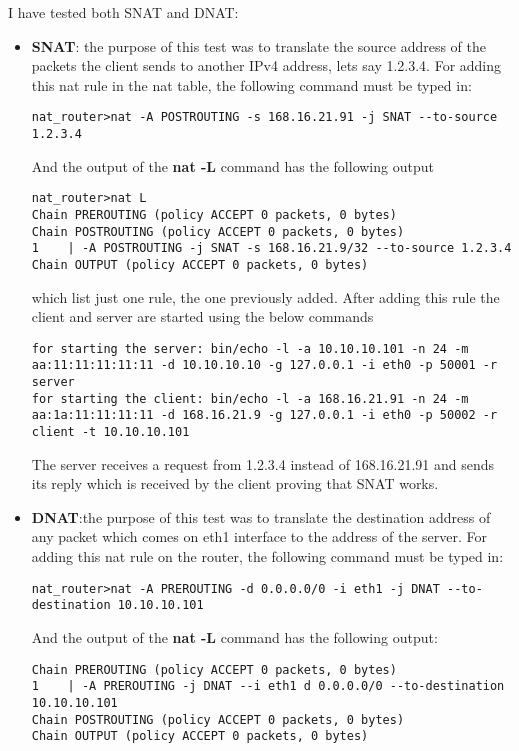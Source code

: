 {{I have tested both SNAT and DNAT:
\begin{itemize}
\item \textbf{SNAT}: the purpose of this test was to translate the source address of the packets the client sends to another IPv4 address, lets say 1.2.3.4.
For adding this nat rule in the nat table, the following command must be typed in:
\lstset{language=TeX, caption=Add SNAT rule}
\begin{lstlisting}
nat_router>nat -A POSTROUTING -s 168.16.21.91 -j SNAT --to-source 1.2.3.4
\end{lstlisting}
And the output of the \textbf{nat -L} command has the following output
\lstset{language=TeX, caption=List all rules for standard NAT chains}
\begin{lstlisting}
nat_router>nat L
Chain PREROUTING (policy ACCEPT 0 packets, 0 bytes)
Chain POSTROUTING (policy ACCEPT 0 packets, 0 bytes)
1	 | -A POSTROUTING -j SNAT -s 168.16.21.9/32 --to-source 1.2.3.4
Chain OUTPUT (policy ACCEPT 0 packets, 0 bytes)
\end{lstlisting}

which list just one rule, the one previously added. 
After adding this rule the client and server are started using the below commands
\lstset{language=TeX, caption=SNAT-starting client and server applications}
\begin{lstlisting}
for starting the server: bin/echo -l -a 10.10.10.101 -n 24 -m aa:11:11:11:11:11 -d 10.10.10.10 -g 127.0.0.1 -i eth0 -p 50001 -r server 
for starting the client: bin/echo -l -a 168.16.21.91 -n 24 -m aa:1a:11:11:11:11 -d 168.16.21.9 -g 127.0.0.1 -i eth0 -p 50002 -r client -t 10.10.10.101
\end{lstlisting}
 The server receives a request from 1.2.3.4 instead of 168.16.21.91 and sends its reply which is received by the client proving that SNAT works.
\item \label{nat-impl:DNAT} \textbf{DNAT}:the purpose of this test was to translate the destination address of any packet which comes on eth1 interface to the address of the server.
For adding this nat rule on the router, the following command must be typed in:
\lstset{language=TeX, caption=Add DNAT rule}
\begin{lstlisting}
nat_router>nat -A PREROUTING -d 0.0.0.0/0 -i eth1 -j DNAT --to-destination 10.10.10.101
\end{lstlisting}
And the output of the \textbf{nat -L} command has the following output:
\lstset{language=TeX, caption=List all rules for standard NAT chains}
\begin{lstlisting}
Chain PREROUTING (policy ACCEPT 0 packets, 0 bytes)
1	 | -A PREROUTING -j DNAT --i eth1 d 0.0.0.0/0 --to-destination 10.10.10.101
Chain POSTROUTING (policy ACCEPT 0 packets, 0 bytes)
Chain OUTPUT (policy ACCEPT 0 packets, 0 bytes)
\end{lstlisting}


\end{itemize}}}
